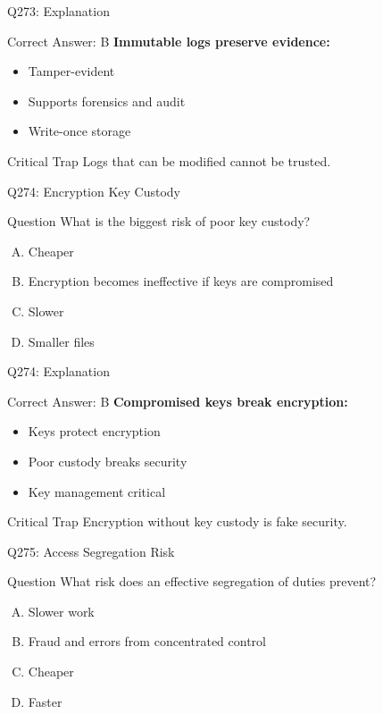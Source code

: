 \documentclass{beamer}
\begin{document}
	\begin{frame}{Q273: Explanation}
		\begin{block}{Correct Answer: B}
			\textbf{Immutable logs preserve evidence:}
			\begin{itemize}
				\item Tamper-evident
				\item Supports forensics and audit
				\item Write-once storage
			\end{itemize}
		\end{block}
		\begin{alertblock}{Critical Trap}
			Logs that can be modified cannot be trusted.
		\end{alertblock}
	\end{frame}
	
	\begin{frame}{Q274: Encryption Key Custody}
		\begin{block}{Question}
			What is the biggest risk of poor key custody?
		\end{block}
		\begin{enumerate}[(A)]
			\item Cheaper
			\item Encryption becomes ineffective if keys are compromised
			\item Slower
			\item Smaller files
		\end{enumerate}
	\end{frame}
	
	\begin{frame}{Q274: Explanation}
		\begin{block}{Correct Answer: B}
			\textbf{Compromised keys break encryption:}
			\begin{itemize}
				\item Keys protect encryption
				\item Poor custody breaks security
				\item Key management critical
			\end{itemize}
		\end{block}
		\begin{alertblock}{Critical Trap}
			Encryption without key custody is fake security.
		\end{alertblock}
	\end{frame}
	
	\begin{frame}{Q275: Access Segregation Risk}
		\begin{block}{Question}
			What risk does an effective segregation of duties prevent?
		\end{block}
		\begin{enumerate}[(A)]
			\item Slower work
			\item Fraud and errors from concentrated control
			\item Cheaper
			\item Faster
		\end{enumerate}
	\end{frame}
	
\end{document}
